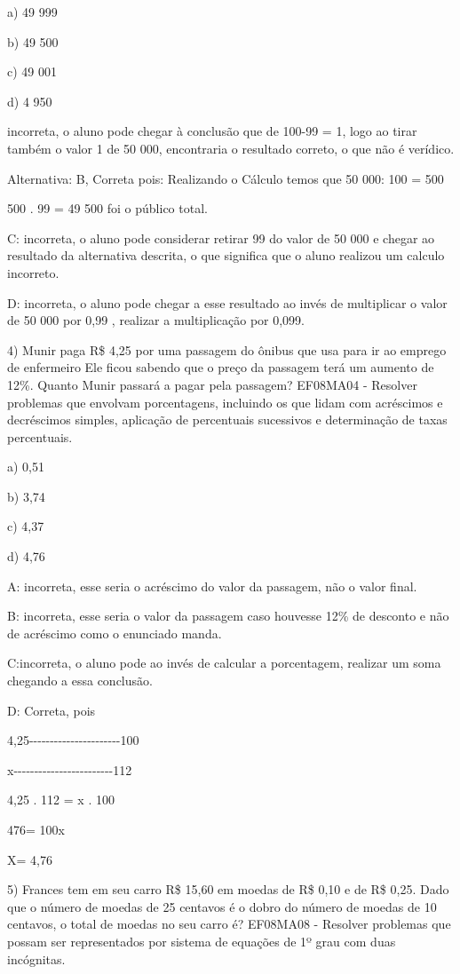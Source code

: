 {a) 49 999

b) 49 500

c) 49 001

d) 4 950

incorreta, o aluno pode chegar à conclusão que de 100-99 = 1, logo ao
tirar também o valor 1 de 50 000, encontraria o resultado correto, o que
não é verídico.

Alternativa: B, Correta pois: Realizando o Cálculo temos que 50 000: 100
= 500

500 . 99 = 49 500 foi o público total.

C: incorreta, o aluno pode considerar retirar 99 do valor de 50 000 e
chegar ao resultado da alternativa descrita, o que significa que o aluno
realizou um calculo incorreto.

D: incorreta, o aluno pode chegar a esse resultado ao invés de
multiplicar o valor de 50 000 por 0,99 , realizar a multiplicação por
0,099.

4) Munir paga R\$ 4,25 por uma passagem do ônibus que usa para ir ao
emprego de enfermeiro Ele ficou sabendo que o preço da passagem terá um
aumento de 12\%. Quanto Munir passará a pagar pela passagem? EF08MA04 -
Resolver problemas que envolvam porcentagens, incluindo os que lidam com
acréscimos e decréscimos simples, aplicação de percentuais sucessivos e
determinação de taxas percentuais.

a) 0,51

b) 3,74

c) 4,37

d) 4,76

A: incorreta, esse seria o acréscimo do valor da passagem, não o valor
final.

B: incorreta, esse seria o valor da passagem caso houvesse 12\% de
desconto e não de acréscimo como o enunciado manda.

C:incorreta, o aluno pode ao invés de calcular a porcentagem, realizar
um soma chegando a essa conclusão.

D: Correta, pois

4,25-\/-\/-\/-\/-\/-\/-\/-\/-\/-\/-\/-\/-\/-\/-\/-\/-\/-\/-\/-\/-\/-100

x-\/-\/-\/-\/-\/-\/-\/-\/-\/-\/-\/-\/-\/-\/-\/-\/-\/-\/-\/-\/-\/-\/-\/-112

4,25 . 112 = x . 100

476= 100x

X= 4,76

5) Frances tem em seu carro R\$ 15,60 em moedas de R\$ 0,10 e de R\$
0,25. Dado que o número de moedas de 25 centavos é o dobro do número de
moedas de 10 centavos, o total de moedas no seu carro é? EF08MA08 -
Resolver problemas que possam ser representados por sistema de equações
de 1º grau com duas incógnitas.

}

